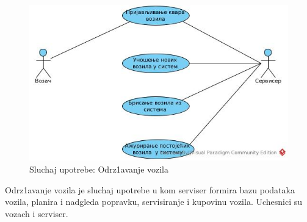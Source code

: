 \begin{figure}[h!]
    \includegraphics[scale = 0.45]{Slike/UML/SUodrzavanje.jpg}
    \centering
    \caption{Sluchaj upotrebe: Odrz1avanje vozila}
    \label{odrzavanje vozila}
\end{figure}  
Odrz1avanje vozila je sluchaj upotrebe u kom serviser formira bazu podataka vozila, planira i nadgleda popravku, servisiranje i kupovinu vozila. Uchesnici su vozach i serviser. 
